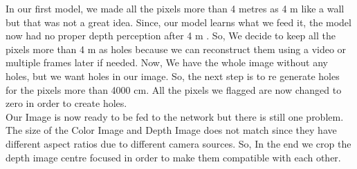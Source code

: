 In our first model, we made all the pixels more than 4 metres as 4 m like a wall but that was not a great idea. Since, our model learns what we feed it, the model now had no proper depth perception after 4 m  . So, We decide to keep all the pixels more than 4 m as holes because we can reconstruct them using a video or multiple frames later if needed. Now, We have the whole image without any holes, but we want holes in our image. So, the next step is to re generate holes for the pixels more than 4000 cm. All the pixels we flagged are now changed to zero in order to create holes. \\

Our Image is now ready to be fed to the network but there is still one problem. The size of the Color Image and Depth Image does not match since they have different aspect ratios due to different camera sources. So, In the end we crop the depth image centre focused in order to make them compatible with each other.\\

\newpage